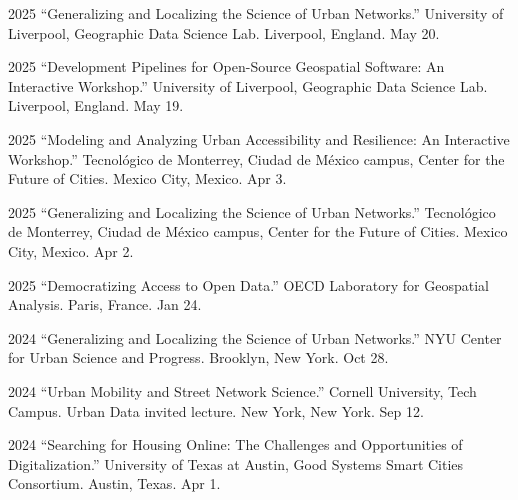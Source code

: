 \documentclass[11pt,letterpaper]{report} %
\begin{document}
    \begin{tablist}



        \item[2025] \tab{}\enquote{Generalizing and Localizing the Science of Urban Networks.} University of Liverpool, Geographic Data Science Lab. Liverpool, England. May 20.

        \item[2025] \tab{}\enquote{Development Pipelines for Open-Source Geospatial Software: An Interactive Workshop.} University of Liverpool, Geographic Data Science Lab. Liverpool, England. May 19.

        \item[2025] \tab{}\enquote{Modeling and Analyzing Urban Accessibility and Resilience: An Interactive Workshop.} Tecnológico de Monterrey, Ciudad de México campus, Center for the Future of Cities. Mexico City, Mexico. Apr 3.

        \item[2025] \tab{}\enquote{Generalizing and Localizing the Science of Urban Networks.} Tecnológico de Monterrey, Ciudad de México campus, Center for the Future of Cities. Mexico City, Mexico. Apr 2.

        \item[2025] \tab{}\enquote{Democratizing Access to Open Data.} OECD Laboratory for Geospatial Analysis. Paris, France. Jan 24.

        \item[2024] \tab{}\enquote{Generalizing and Localizing the Science of Urban Networks.} NYU Center for Urban Science and Progress. Brooklyn, New York. Oct 28.

        \item[2024] \tab{}\enquote{Urban Mobility and Street Network Science.} Cornell University, Tech Campus. Urban Data invited lecture. New York, New York. Sep 12.

        \item[2024] \tab{}\enquote{Searching for Housing Online: The Challenges and Opportunities of Digitalization.} University of Texas at Austin, Good Systems Smart Cities Consortium. Austin, Texas. Apr 1.


\end{tablist}
\end{document}
